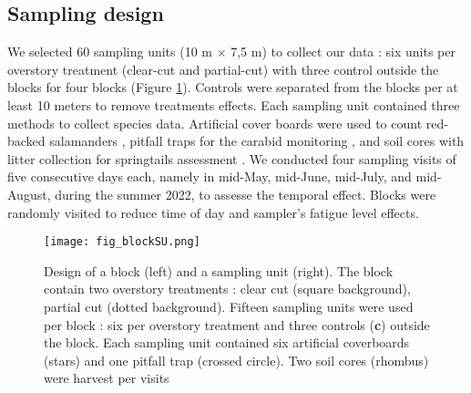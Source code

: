 \subsection*{Sampling design}
\label{subsec:sampling}





We selected 60 sampling units (10 m $\times$ 7,5 m) to collect our data : six units per overstory treatment (clear-cut and partial-cut) with three control outside the blocks for four blocks (Figure \ref*{fig:blockSU}).
Controls were separated from the blocks per at least 10 meters to remove treatments effects.
Each sampling unit contained three methods to collect species data. 
Artificial cover boards were used to count red-backed salamanders \citep{hesedUncoveringSalamanderEcology2012,mazerolleWoodlandSalamanderPopulation2021a,mooreComparisonPopulationEastern2009c}, 
pitfall traps for the carabid monitoring \citep{spenceSamplingCarabidAssemblages1994a}, and soil cores with litter collection for springtails assessment \citep{rousseauForestFloorMesofauna2018}.
We conducted four sampling visits of five consecutive days each, namely in mid-May, mid-June, mid-July, and mid-August, during the summer 2022, to assesse the temporal effect. 
Blocks were randomly visited to reduce time of day and sampler's fatigue level effects.

\begin{figure}[ht!]
	\centering
	\texttt{[image: fig\_blockSU.png]}
	\caption[Block and a sampling unit design]{
  Design of a block (left) and a sampling unit (right). 
  The block contain two overstory treatments : clear cut (square background), partial cut (dotted background). 
  Fifteen sampling units were used per block : six per overstory treatment and three controls (\textbf{c}) outside the block.
  Each sampling unit contained six artificial coverboards (stars) and one pitfall trap (crossed circle). Two soil cores (rhombus) were harvest per visits
  }
	\label{fig:blockSU}
	\end{figure}  

